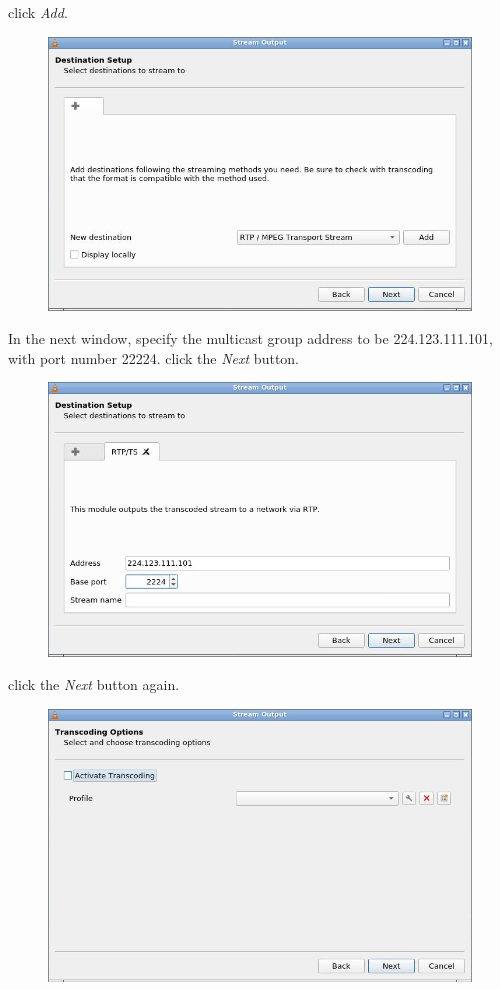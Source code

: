 \documentclass{../UTNetLab}
\begin{document}
    click \textit{Add}.
    \begin{figure}[H]
        \centering
        \includegraphics[scale=1.8]{img/stream2}
    \end{figure}
    In the next window, specify the multicast group address to be {224.123.111.101}, with port number {22224}.
    click the \textit{Next} button.
    \begin{figure}[H]
        \centering
        \includegraphics[scale=1.8]{img/stream3}
    \end{figure}
    click the \textit{Next} button again.
    \begin{figure}[H]
        \centering
        \includegraphics[scale=1.7]{img/stream4}
    \end{figure}
\end{document}
